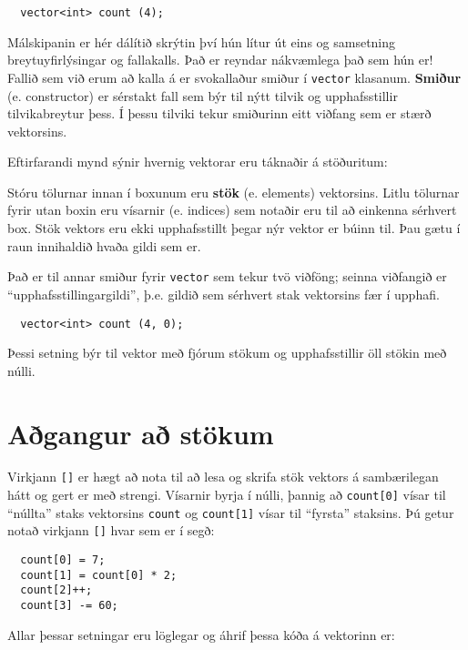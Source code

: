 \begin{verbatim}
  vector<int> count (4);
\end{verbatim}
%
Málskipanin er hér dálítið skrýtin því hún lítur út eins og samsetning breytuyfirlýsingar og fallakalls.
Það er reyndar nákvæmlega það sem hún er!
Fallið sem við erum að kalla á er svokallaður smiður í {\tt vector} klasanum.
{\bf Smiður} (e. constructor) er sérstakt fall sem býr til nýtt tilvik og upphafsstillir tilvikabreytur þess.
Í þessu tilviki tekur smiðurinn eitt viðfang sem er stærð vektorsins.


Eftirfarandi mynd sýnir hvernig vektorar eru táknaðir á stöðuritum:

\vspace{0.1in}
\centerline{}
\vspace{0.1in}

Stóru tölurnar innan í boxunum eru {\bf stök} (e. elements) vektorsins. 
Litlu tölurnar fyrir utan boxin eru vísarnir (e. indices) sem notaðir eru til að einkenna sérhvert box.
Stök vektors eru ekki upphafsstillt þegar nýr vektor er búinn til.
Þau gætu í raun innihaldið hvaða gildi sem er.

Það er til annar smiður fyrir {\tt vector} sem tekur tvö viðföng; seinna viðfangið er ``upphafsstillingargildi'', þ.e. gildið sem sérhvert stak vektorsins fær í upphafi.

\begin{verbatim}
  vector<int> count (4, 0);
\end{verbatim}
%
Þessi setning býr til vektor með fjórum stökum og upphafsstillir öll stökin með núlli.

\section{Aðgangur að stökum}

Virkjann {\tt []} er hægt að nota til að lesa og skrifa stök vektors á sambærilegan hátt og gert er með strengi.
Vísarnir byrja í núlli, þannig að {\tt count[0]} vísar til ``núllta'' staks vektorsins {\tt count} og
{\tt count[1]} vísar til ``fyrsta'' staksins.
Þú getur notað virkjann {\tt []} hvar sem er í segð:

\begin{verbatim}
  count[0] = 7;
  count[1] = count[0] * 2;
  count[2]++;
  count[3] -= 60;
\end{verbatim}
%
Allar þessar setningar eru löglegar og áhrif þessa kóða á vektorinn er: 

